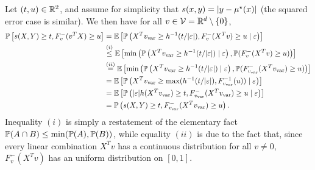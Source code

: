 Let $(t,u) \in \R^2$,  and assume for simplicity that $\score(x,y) = \left| y - \mu^\star(x) \right|$ (the squared error case is similar).
We then have for all $v \in \mc{V} = \R^d \setminus \{0\}$, 
\begin{align*}
\P\left[ \score(X,Y) \ge t, F_v^-(v^T X) \ge u \right]
&= \E \left[  \P \left( X^T \vvar \ge h^{-1}(t/|\varepsilon|), F_v^-(X^T v) \ge u \mid \varepsilon \right) \right]  \\
&\overset{(i)}{\le} \E \left[ \min\left(  \P \left( X^T \vvar \ge h^{-1}(t/|\varepsilon|) \mid \varepsilon \right),  \P( F_v^-(X^T v) \ge u) \right) \right] \\
&\overset{(ii)}{=}  \E \left[ \min\left(  \P \left( X^T \vvar \ge h^{-1}(t/|\varepsilon|) \mid \varepsilon \right),  \P( F_{\vvar}^-(X^T \vvar) \ge u) \right) \right] \\
&= \E \left[ 
	\P\left( X^T \vvar \ge \max(  h^{-1}(t/|\varepsilon|),  F_{\vvar}^{-1}(u)) \mid \varepsilon \right) 
\right] \\
&= \E \left[ 
	\P\left( |\varepsilon| h(X^T \vvar) \ge t, F_{\vvar}^-(X^T \vvar) \ge u \mid \varepsilon \right) 
\right] \\
&= \P\left( \score(X,Y) \ge t, F_{\vvar}^-(X^T \vvar) \ge u \right).
\end{align*} 
Inequality $(i)$ is simply a restatement of the elementary fact $\P( A \cap B) \le \min(\P(A), \P(B))$, while equality $(ii)$ is due to the fact that, since every linear combination $X^T v$ has a continuous distribution for all $v \neq 0$,  $F_v^-(X^T v)$ has an uniform distribution on $[0,1]$.

